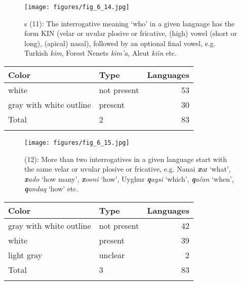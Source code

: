 \clearpage %
\begin{figure}
\texttt{[image: figures/fig\_6\_14.jpg]}
\caption{s (11): The interrogative meaning ‘who’ in a given language has the form KIN (velar or uvular plosive or fricative, (high) vowel (short or long), (apical) nasal), followed by an optional final vowel, e.g. Turkish \textit{kim}, Forest Nenets \textit{kim’a}, Aleut \textit{kiin} etc.}
\label{fig:6:14}
\end{figure}

\begin{table}
\begin{tabularx}{\textwidth}{lQr}
\lsptoprule

\textbf{Color} & \textbf{Type} & \textbf{Languages}\\
\midrule
white & not present & 53\\
gray with white outline & present & 30\\
\midrule Total & 2 & 83\\
\lspbottomrule
\end{tabularx}
\end{table}

\clearpage %
\begin{figure}
\texttt{[image: figures/fig\_6\_15.jpg]}
\caption{ (12): More than two interrogatives in a given language start with the same velar or uvular plosive or fricative, e.g. Nanai \textbf{\textit{x}}\textit{aɪ} ‘what’, \textbf{\textit{x}}\textit{ado} ‘how many’, \textbf{\textit{x}}\textit{ooni} ‘how’, Uyghur \textbf{\textit{q}}\textit{aysi} ‘which’, \textbf{\textit{q}}\textit{ačan} ‘when’, \textbf{\textit{q}}\textit{andaq} ‘how’ etc.}
\label{fig:6:15}
\end{figure}

\begin{table}
\begin{tabularx}{\textwidth}{lQr}
\lsptoprule

\textbf{Color} & \textbf{Type} & \textbf{Languages}\\
\midrule
gray with white outline & not present & 42\\
white & present & 39\\
light gray & unclear & 2\\
\midrule Total & 3 & 83\\
\lspbottomrule
\end{tabularx}
\end{table}

